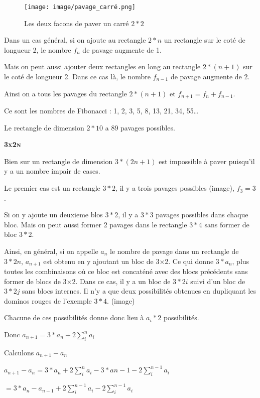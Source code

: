 \documentclass{article}
\begin{document}
\begin{figure} [!h]
    \center
    \texttt{[image: image/pavage\_carré.png]}
    \caption{Les deux facons de paver un carré  $2*2$}
\end{figure}

Dans un cas général, si on ajoute au rectangle $2*n$ un rectangle sur le coté de longueur 2, le nombre $f_{n}$ de pavage augmente de 1.

Mais on peut aussi ajouter deux rectangles en long au rectangle $2*(n+1)$ sur le coté de longueur 2. Dans ce cas là, le nombre $f_{n-1}$ de pavage augmente de 2.

Ainsi on a tous les pavages du rectangle $2*(n+1)$ et $f_{n+1} = f_{n} + f_{n-1}$.

Ce sont les nombres de Fibonacci : 1, 2, 3, 5, 8, 13, 21, 34, 55…

Le rectangle de dimension $2*10$ a 89 pavages possibles.

\hspace{1.5cm}

\textbf{\textsc{3x2n}}

Bien sur un rectangle de dimension $3*(2n+1)$ est impossible à paver puisqu'il y a un nombre impair de cases.

Le premier cas est un rectangle $3*2$, il y a trois pavages possibles (image), $f_{3} = 3$.

Si on y ajoute un deuxieme blos $3*2$, il y a $3*3$ pavages possibles dans chaque bloc.
Mais on peut aussi former 2 pavages dans le rectangle $3*4$ sans former de bloc $3*2$.

Ainsi, en général, si on appelle $a_{n}$ le nombre de pavage dans un rectangle de $3*2n$, $a_{n+1}$ est obtenu en y ajoutant un bloc de 3×2.
Ce qui donne $3*a_{n}$, plus toutes les combinaisons où ce bloc est concaténé avec des blocs précédents sans former de blocs de 3×2.
Dans ce cas, il y a un bloc de $3*2i$ suivi d'un bloc de $3*2j$ sans blocs internes. Il n'y a que deux possibilités obtenues en dupliquant les dominos rouges de l'exemple $3*4$. (image)

Chacune de ces possibilités donne donc lieu à $a_{i}*2$ possibilités.

Donc $a_{n+1} = 3*a_{n} + 2\sum_{i}^{n}a_{i}$

Calculons $a_{n+1} - a_{n}$

$a_{n+1} - a_{n}   = 3*a_{n} + 2\sum_{i}^{n}a_{i} - 3*an-1 - 2\sum_{i}^{n-1}a_{i}$

$= 3*a_{n} - a_{n-1} + 2\sum_{i}^{n-1}a_{i} - 2\sum_{i}^{n-1}a_{i}$
\end{document}
